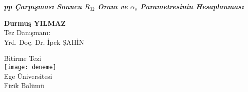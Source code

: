 \begin{titlepage}


\begin{center}


              
        \textbf{\large \emph{ pp Çarpışması Sonucu $R_{32}$ Oranı ve $\alpha_s$ Parametresinin Hesaplanması}}
        
        \vspace{0.5cm}
        
        \vspace{1.5cm}
        
        \textbf{Durmuş YILMAZ}\\[4em]
		\centering
        Tez Danışmanı:\\
       	Yrd. Doç. Dr. İpek ŞAHİN\\
       	 
        \vfill
        
        Bitirme Tezi\\[4em]



        
        
       
        

 
			
		\texttt{[image: deneme]} \\
		Ege Üniversitesi\\
		Fizik Bölümü\\
		 
		  
		  
		  
		  
		
     \end{center}   
  \end{titlepage}
